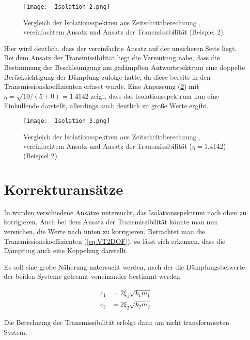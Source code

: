 \begin{figure}[H]
    \centering
    \texttt{[image: \_Isolation\_2.png]}
    \caption{Vergleich der Isolationsspektren aus Zeitschrittberechnung \cite{Isemann}, vereinfachtem Ansatz und Ansatz der Transmissibilität (Beispiel 2)}
    \label{fig:Isolation}
\end{figure}

Hier wird deutlich, dass der vereinfachte Ansatz auf der unsicheren Seite liegt.
Bei dem Ansatz der Transmissibilität liegt die Vermutung nahe, dass die Bestimmung der Beschleunigung am gedämpften Antwortspektrum eine doppelte Berücksichtigung der Dämpfung zufolge hatte, da diese bereits in den Transmissionskoeffizienten erfasst wurde.
Eine Anpassung (\cref{fig:Isolation2}) mit $\eta = \sqrt{10/(5+0)} = 1.4142$ zeigt, dass das Isolationsspektrum nun eine Einhüllende darstellt, allerdings auch deutlich zu große Werte ergibt.

\begin{figure}[H]
    \centering
    \texttt{[image: \_Isolation\_3.png]}
    \caption{Vergleich der Isolationsspektren aus Zeitschrittberechnung \cite{Isemann}, vereinfachtem Ansatz und Ansatz der Transmissibilität ($\eta = 1.4142$) (Beispiel 2)}
    \label{fig:Isolation2}
\end{figure}

\section{Korrekturansätze}
\label{sec:Korrekturansaetze}

In \cite{Isemann} wurden verschiedene Ansätze untersucht, das Isolationsspektrum nach oben zu korrigieren.
Auch bei dem Ansatz der Transmissibilität könnte man nun versuchen, die Werte nach unten zu korrigieren. Betrachtet man die Transmissionskoeffizienten (\cref{eq:VT2DOF}), so lässt sich erkennen, dass die Dämpfung auch eine Koppelung darstellt. 

Es soll eine grobe Näherung untersucht werden, nach der die Dämpfungsbeiwerte der beiden Systeme getrennt voneinander bestimmt werden.

\begin{align*}
c_1 &= 2 \xi_1 \sqrt{k_1 m_1}\\
c_2 &= 2 \xi_2 \sqrt{k_2 m_2}
\end{align*}

Die Berechnung der Transmissibilität erfolgt dann am nicht transformierten System.

